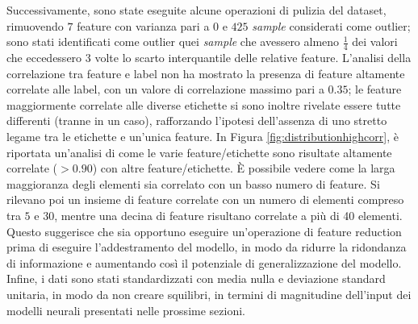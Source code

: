 Successivamente, sono state eseguite alcune operazioni di pulizia del dataset, rimuovendo $7$ feature con varianza pari a $0$ e $425$ \textit{sample} considerati come outlier; sono stati identificati come outlier quei \textit{sample} che avessero almeno $\frac{1}{4}$ dei valori che eccedessero $3$ volte lo scarto interquantile delle relative feature.
L'analisi della correlazione tra feature e label non ha mostrato la presenza di feature altamente correlate alle label, con un valore di correlazione massimo pari a $0.35$; le feature maggiormente correlate alle diverse etichette si sono inoltre rivelate essere tutte differenti (tranne in un caso), rafforzando l'ipotesi dell'assenza di uno stretto legame tra le etichette e un'unica feature.
In Figura \ref{fig:distributionhighcorr}, è riportata un'analisi di come le varie feature/etichette sono risultate altamente correlate ($> 0.90$) con altre feature/etichette. 
È possibile vedere come la larga maggioranza degli elementi sia correlato con un basso numero di feature.
Si rilevano poi un insieme di feature correlate con un numero di elementi compreso tra $5$ e $30$, mentre una decina di feature risultano correlate a più di 40 elementi. 
Questo suggerisce che sia opportuno eseguire un'operazione di feature reduction prima di eseguire l'addestramento del modello, in modo da ridurre la ridondanza di informazione e aumentando così il potenziale di generalizzazione del modello.
Infine, i dati sono stati standardizzati con media nulla e deviazione standard unitaria, in modo da non creare squilibri, in termini di magnitudine dell'input dei modelli neurali presentati nelle prossime sezioni.%